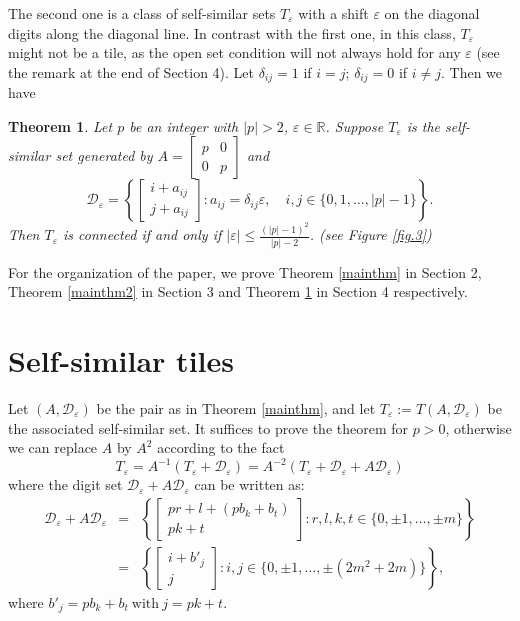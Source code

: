 \documentclass[12pt, reqno]{amsart}
\newtheorem{theorem}{Theorem}[section]
\numberwithin{equation}{section}
\begin{document}
The second one is a class of self-similar sets  $T_\varepsilon$ with a shift $\varepsilon$ on  the diagonal digits along the diagonal line. In contrast with the first one, in this class, $T_\varepsilon$ might not be a tile, as the open set condition will not always hold for any $\varepsilon$ (see the remark at the end of Section 4). Let $\delta_{ij}=1$ if $i=j$; $\delta_{ij}=0$ if $i \ne j$. Then we have

\begin{theorem}\label{mainthm3}
Let $p$ be an integer with $|p|>2$, $\varepsilon\in {\mathbb R}$. Suppose $T_\varepsilon$ is the self-similar set generated by  $A=\left[\begin{array}{cc}
p& 0 \\
0 & p
\end{array}\right]$ and
$${\mathcal D}_\varepsilon=\left\{\left[\begin{array}{c}
i+a_{ij}\\
j+a_{ij}
\end{array}\right]: a_{ij}=\delta_{ij}\varepsilon, \quad
   i, j\in \{0, 1, \dots,|p|-1\}\right\}.$$
Then $T_\varepsilon$ is connected if and only if $|\varepsilon|\leq \frac{(|p|-1)^{2}}{|p|-2}$. (see Figure \ref{fig.3})
\end{theorem}


For the organization of the paper, we prove Theorem \ref{mainthm} in Section 2, Theorem \ref{mainthm2} in Section 3 and Theorem \ref{mainthm3} in Section 4 respectively.







\section{\bf Self-similar tiles}
Let $(A, {\mathcal D}_\varepsilon)$  be the pair as in Theorem \ref{mainthm}, and let $T_\varepsilon:=T(A, {\mathcal D}_\varepsilon)$ be the associated self-similar set. It suffices to prove the theorem for $p>0$, otherwise we can replace $A$ by $A^2$ according to the fact
$$T_\varepsilon=A^{-1}(T_\varepsilon+{\mathcal D}_\varepsilon)=A^{-2}(T_\varepsilon+{\mathcal D}_\varepsilon+A{\mathcal D}_\varepsilon)$$ where  the digit set ${\mathcal D}_\varepsilon+A{\mathcal D}_\varepsilon$ can be written as:
\begin{eqnarray*}
{\mathcal D}_\varepsilon+A{\mathcal D}_\varepsilon &=& \left\{\left[\begin{array}{c}
pr+l+(pb_k +b_t)\\pk+t\end{array}\right]:r,l,k,t\in\{0,\pm1,\dots,\pm m\}\right\} \\
&=& \left\{\left[\begin{array}{c}i+b'_j\\j\end{array}\right]:i,j\in\{0,\pm1,\dots,\pm(2m^2+2m)\}\right\},
\end{eqnarray*}
where $b'_j=pb_k +b_t\ \text{with}\ j=pk+t$.
\end{document}
